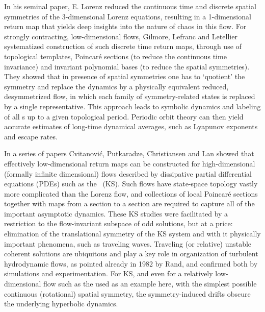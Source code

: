 \documentclass[preprint,number,sort&compress]{elsarticle}
\begin{document}
In his seminal paper, E. Lorenz reduced the
continuous time and discrete spatial symmetries of the
3-dimensional Lorenz equations, resulting in a 1-dimensional
return map that yields deep insights into the
nature of chaos in this flow. For strongly contracting,
low-dimensional flows, Gilmore, Lefranc and
Letellier systematized construction
of such discrete time return maps, through use of topological
templates, Poincar\'e sections (to reduce the continuous time
invariance) and in\-vari\-ant polynomial bases (to reduce the
spatial symmetries). They showed that in presence of spatial
symmetries one has to  `quotient' the symmetry and replace
the dynamics by a physically equivalent reduced,
desymmetrized flow, in which each family of symmetry-related
states is replaced by a single representative. This approach
leads to symbolic dynamics and labeling of all \po s up to a
given topological period. Periodic orbit theory can then
yield accurate estimates of long-time dynamical averages,
such as Lyapunov exponents and escape rates.

In a series of papers Cvitanovi\'{c}, Putkaradze,
Christiansen and Lan%
showed that effectively low-dimensional return maps can be
constructed for high-dimensional (formally infinite
dimensional)  flows described by dissipative partial
differential equations (PDEs) such as the \KSe\ (KS). Such
flows have state-space topology vastly more complicated than
the Lorenz flow, and collections of local Poincar\'e sections
together with maps from a section to a section are required
to capture all of the important asymptotic dynamics. These KS
studies were facilitated by a restriction to the
flow-in\-vari\-ant subspace of odd solutions, but at a price:
elimination of the translational symmetry of the KS system
and with it physically important phenomena, such as traveling
waves. Traveling (or relative) unstable coherent solutions
are ubiquitous and play a key role in organization of
turbulent hydrodynamic flows, as pointed already in
1982 by Rand, and confirmed both by
simulations and
experimentation.
For KS, and even for a relatively
low-dimensional flow such as the
\cLe{} used as an example here, with
the simplest possible continuous (rotational) spatial
symmetry, the symmetry-induced drifts obscure the underlying
hyperbolic dynamics.
\end{document}
